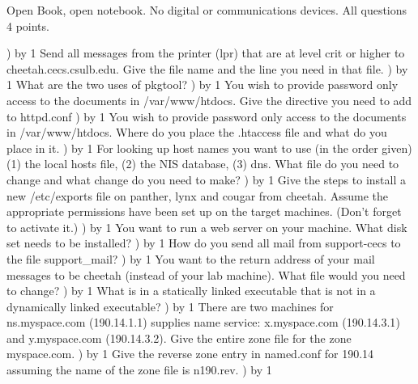
\parindent=0in
\nopagenumbers
\newcount\quesno
{}
\def\ques{\number\quesno) \advance\quesno by 1}
\def\aspace{\vskip 1.5in}

Open Book, open notebook. No digital or communications devices.
All questions 4 points.

\ques
Send all messages from the printer
({\ltt{}lpr}) that are at level {\ltt{}crit} or higher
to {\ltt{}cheetah.cecs.csulb.edu}.
Give the file name and the line you need in that file.
\vskip 0.8in
\ques
What are the two uses of {\ltt{}pkgtool}?
\vskip 1.2in
\ques
You wish to provide password only access to the documents in
{\ltt{}/var/www/htdocs}.
Give the directive you need to add to {\ltt{}httpd.conf}
\vskip 2.8in
\ques
You wish to provide password only access to the documents in
{\ltt{}/var/www/htdocs}.
Where do you place the {\ltt{}.htaccess} file and
what do you place in it.
\vskip 2.3in
\vfill\eject
\ques
For looking up host names you want to use (in the order given)
(1) the local hosts file, (2) the NIS database, (3) dns.
What file do you need to change and what change do you need to make?
\vskip 1.2in
\ques
Give the steps to install a new {\ltt{}/etc/exports} file on 
{\ltt{}panther}, {\ltt{}lynx} and {\ltt{}cougar} from {\ltt{}cheetah}.
Assume the appropriate permissions have been set up on the
target machines.
(Don't forget to activate it.)
\vskip 2.4in
\ques
You want to run a web server on your machine.
What disk set needs to be installed?
\vskip 0.8in
\ques
How do you send all mail from {\ltt{}support-cecs} to
the file {\ltt{}support_mail}?
\vskip 1.6in
\vfill\eject
\ques
You want to the return address of your mail messages to be {\ltt{}cheetah}
(instead of your lab machine).
What file would you need to change?
\vskip 0.7in
\ques
What is in a statically linked executable that is not in a dynamically
linked executable?
\vskip 0.7in
\ques
There are two machines for {\ltt{}ns.myspace.com} ({\ltt{}190.14.1.1})
supplies name service:
{\ltt{}x.myspace.com} ({\ltt{}190.14.3.1}) and 
{\ltt{}y.myspace.com} ({\ltt{}190.14.3.2}).
Give the entire zone file for the zone {\ltt{}myspace.com}.
\vskip 4.3in
\ques
Give the reverse zone entry in {\ltt{}named.conf}
for {\ltt{}190.14}  assuming
the name of the zone file is {\ltt{}n190.rev}.
\vfill\eject
\ques
